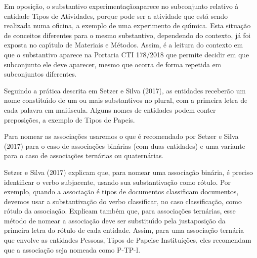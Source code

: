 \documentclass[
12pt,		%
openright,	%
twoside,  %
a4paper,			%
chapter=TITLE,		%
english,			%
french,				%
spanish,			%
brazil				%
]{USPSC-classe/USPSC}
\begin{document}
Em oposi\c{c}\~ao, o substantivo \textquotedbl experimenta\c{c}\~ao\textquotedbl  aparece no subconjunto relativo \`a entidade \textquotedbl Tipos de Atividades\textquotedbl , porque pode ser a atividade que est\'a sendo realizada numa oficina, a exemplo de uma experimento de qu\'{\i}mica. Esta situa\c{c}\~ao de conceitos diferentes para o mesmo substantivo, dependendo do contexto, j\'a foi exposta no cap\'{\i}tulo de Materiais e M\'etodos. Assim, \'e a leitura do contexto em que o substantivo aparece na Portaria CTI 178/2018 que permite decidir em que subconjunto ele deve aparecer, mesmo que ocorra de forma repetida em subconjuntos diferentes.










Seguindo a pr\'atica descrita em  Setzer e Silva (2017), as entidades receber\~ao um nome constitu\'{\i}do de um ou mais substantivos no plural, com a primeira letra de cada palavra em mai\'uscula. Alguns nomes de entidades podem conter preposi\c{c}\~oes, a exemplo de \textquotedbl Tipos de Papeis\textquotedbl .










Para nomear as associa\c{c}\~oes usaremos o que \'e recomendado por Setzer e Silva (2017) para o caso de associa\c{c}\~oes bin\'arias (com duas entidades) e uma variante para o caso de associa\c{c}\~oes tern\'arias ou quatern\'arias.










 Setzer e Silva (2017) explicam que, para nomear uma associa\c{c}\~ao bin\'aria, \'e preciso identificar o verbo subjacente, usando sua substantiva\c{c}\~ao como r\'otulo. Por exemplo, quando a associa\c{c}\~ao \'e \textquotedbl tipos de documentos classificam documentos\textquotedbl , devemos usar a substantiva\c{c}\~ao do verbo \textquotedbl classificar\textquotedbl , no caso \textquotedbl classifica\c{c}\~ao\textquotedbl , como r\'otulo da associa\c{c}\~ao. Explicam tamb\'em que, para associa\c{c}\~oes tern\'arias, esse m\'etodo de nomear a associa\c{c}\~ao deve ser substitu\'{\i}do pela justaposi\c{c}\~ao da primeira letra do r\'otulo de cada entidade. Assim, para uma associa\c{c}\~ao tern\'aria que envolve as entidades \textquotedbl Pessoas\textquotedbl , \textquotedbl Tipos de Papeis\textquotedbl  e \textquotedbl Institui\c{c}\~oes\textquotedbl , eles recomendam que a associa\c{c}\~ao seja nomeada como \textquotedbl P-TP-I\textquotedbl .
\end{document}
